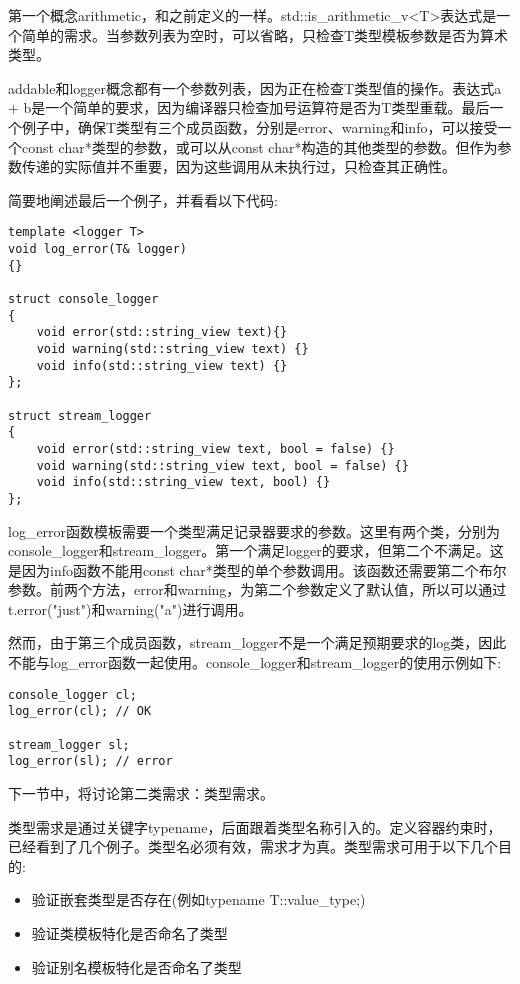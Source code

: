 第一个概念arithmetic，和之前定义的一样。std::is\_arithmetic\_v<T>表达式是一个简单的需求。当参数列表为空时，可以省略，只检查T类型模板参数是否为算术类型。

addable和logger概念都有一个参数列表，因为正在检查T类型值的操作。表达式a + b是一个简单的要求，因为编译器只检查加号运算符是否为T类型重载。最后一个例子中，确保T类型有三个成员函数，分别是error、warning和info，可以接受一个const char*类型的参数，或可以从const char*构造的其他类型的参数。但作为参数传递的实际值并不重要，因为这些调用从未执行过，只检查其正确性。

简要地阐述最后一个例子，并看看以下代码:

\begin{lstlisting}[style=styleCXX]
template <logger T>
void log_error(T& logger)
{}

struct console_logger
{
	void error(std::string_view text){}
	void warning(std::string_view text) {}
	void info(std::string_view text) {}
};

struct stream_logger
{
	void error(std::string_view text, bool = false) {}
	void warning(std::string_view text, bool = false) {}
	void info(std::string_view text, bool) {}
};
\end{lstlisting}

log\_error函数模板需要一个类型满足记录器要求的参数。这里有两个类，分别为console\_logger和stream\_logger。第一个满足logger的要求，但第二个不满足。这是因为info函数不能用const char*类型的单个参数调用。该函数还需要第二个布尔参数。前两个方法，error和warning，为第二个参数定义了默认值，所以可以通过t.error("just")和warning("a")进行调用。

然而，由于第三个成员函数，stream\_logger不是一个满足预期要求的log类，因此不能与log\_error函数一起使用。console\_logger和stream\_logger的使用示例如下:

\begin{lstlisting}[style=styleCXX]
console_logger cl;
log_error(cl); // OK

stream_logger sl;
log_error(sl); // error
\end{lstlisting}

下一节中，将讨论第二类需求：类型需求。


类型需求是通过关键字typename，后面跟着类型名称引入的。定义容器约束时，已经看到了几个例子。类型名必须有效，需求才为真。类型需求可用于以下几个目的:

\begin{itemize}
\item
验证嵌套类型是否存在(例如typename T::value\_type;)

\item
验证类模板特化是否命名了类型

\item
验证别名模板特化是否命名了类型
\end{itemize}

